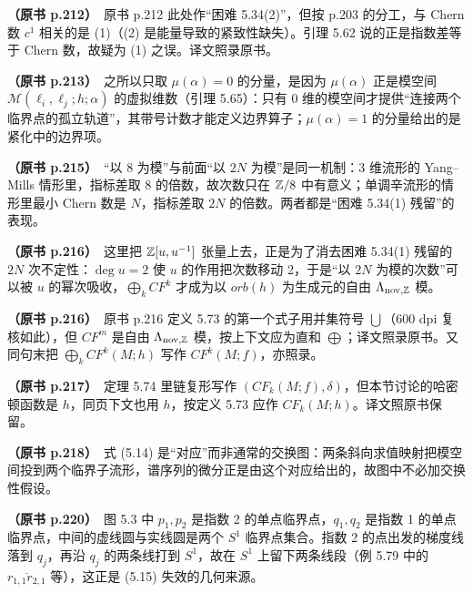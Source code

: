 \noindent \textbf{（原书 p.212）}\ 原书 p.212 此处作“困难 5.34(2)”，但按 p.203 的分工，与 Chern 数 $c^1$ 相关的是 (1)（(2) 是能量导致的紧致性缺失）。引理 5.62 说的正是指数差等于 Chern 数，故疑为 (1) 之误。译文照录原书。\par\smallskip

\noindent \textbf{（原书 p.213）}\ 之所以只取 $\mu(\alpha)=0$ 的分量，是因为 $\mu(\alpha)$ 正是模空间 $\mathcal{M}(\ell_i,\ell_j;h;\alpha)$ 的虚拟维数（引理 5.65）：只有 0 维的模空间才提供“连接两个临界点的孤立轨道”，其带号计数才能定义边界算子；$\mu(\alpha)=1$ 的分量给出的是紧化中的边界项。\par\smallskip

\noindent \textbf{（原书 p.215）}\ “以 8 为模”与前面“以 $2N$ 为模”是同一机制：3 维流形的 Yang–Mills 情形里，指标差取 8 的倍数，故次数只在 $\mathbb{Z}/8$ 中有意义；单调辛流形的情形里最小 Chern 数是 $N$，指标差取 $2N$ 的倍数。两者都是“困难 5.34(1) 残留”的表现。\par\smallskip

\noindent \textbf{（原书 p.216）}\ 这里把 $\mathbb{Z}[u,u^{-1}]$ 张量上去，正是为了消去困难 5.34(1) 残留的 $2N$ 次不定性：$\deg u=2$ 使 $u$ 的作用把次数移动 2，于是“以 $2N$ 为模的次数”可以被 $u$ 的幂次吸收，$\bigoplus_kCF^k$ 才成为以 $orb(h)$ 为生成元的自由 $\Lambda_{\mathrm{nov},\mathbb{Z}}$ 模。\par\smallskip

\noindent \textbf{（原书 p.216）}\ 原书 p.216 定义 5.73 的第一个式子用并集符号 $\bigcup$（600 dpi 复核如此），但 $CF^m$ 是自由 $\Lambda_{\mathrm{nov},\mathbb{Z}}$ 模，按上下文应为直和 $\bigoplus$；译文照录原书。又同句末把 $\bigoplus_kCF^k(M;h)$ 写作 $CF^k(M;f)$，亦照录。\par\smallskip

\noindent \textbf{（原书 p.217）}\ 定理 5.74 里链复形写作 $(CF_k(M;f),\delta)$，但本节讨论的哈密顿函数是 $h$，同页下文也用 $h$，按定义 5.73 应作 $CF_k(M;h)$。译文照原书保留。\par\smallskip

\noindent \textbf{（原书 p.218）}\ 式 (5.14) 是“对应”而非通常的交换图：两条斜向求值映射把模空间投到两个临界子流形，谱序列的微分正是由这个对应给出的，故图中不必加交换性假设。\par\smallskip

\noindent \textbf{（原书 p.220）}\ 图 5.3 中 $p_1,p_2$ 是指数 2 的单点临界点，$q_1,q_2$ 是指数 1 的单点临界点，中间的虚线圆与实线圆是两个 $S^1$ 临界点集合。指数 2 的点出发的梯度线落到 $q_j$，再沿 $q_j$ 的两条线打到 $S^1$，故在 $S^1$ 上留下两条线段（例 5.79 中的 $\overline{r_{1,1}r_{2,1}}$ 等），这正是 (5.15) 失效的几何来源。\par\smallskip

